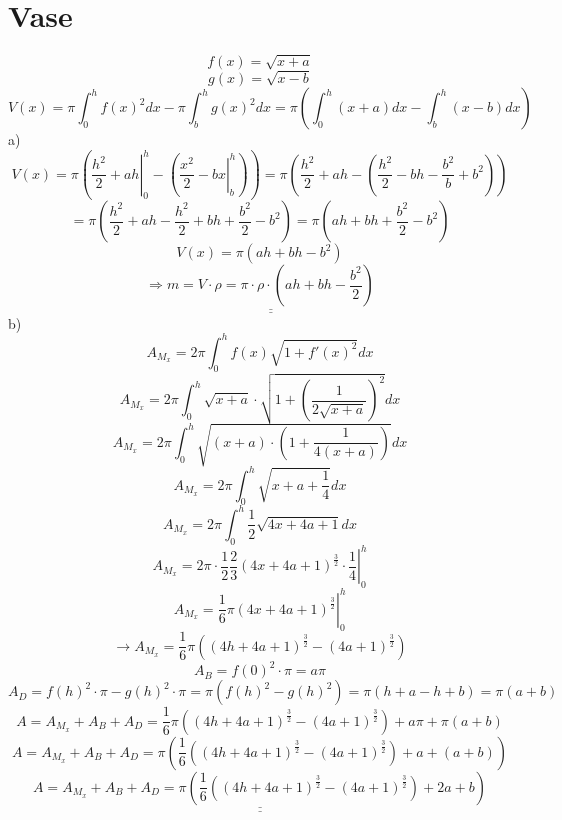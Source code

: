 \section{Vase}
\[ f(x) = \sqrt{x+a} \]
\[ g(x) = \sqrt{x-b} \]
\[ V(x) = \pi \int_0^h f(x)^2 dx - \pi \int_b^h g(x)^2dx = \pi \left( \int_0^h (x+a) dx - \int_b^h (x-b) dx\right) \]
a)
\[ V(x) = \pi\left(\left. \frac{h^2}{2} + ah \right|_0^h - \left(\left. \frac{x^2}{2} - bx \right|_b^h \right) \right) = \pi \left(  \frac{h^2}{2} + ah - \left( \frac{h^2}{2} - bh - \frac{b^2}{b} + b^2 \right)\right) \]
\[ = \pi \left(\frac{h^2}{2} + ah - \frac{h^2}{2} + bh + \frac{b^2}{2} - b^2\right) = \pi \left(ah + bh + \frac{b^2}{2} - b^2\right) \]
\[ V(x) = \pi \left(ah + bh - b^2\right) \]
\[ \Rightarrow \underline{\underline{m = V \cdot \rho = \pi \cdot \rho \cdot \left(ah + bh - \frac{b^2}{2}\right)}} \]
b)
\[ A_{M_x} = 2 \pi \int_0^h f(x) \sqrt{1 + f'(x)^2} dx \]
\[ A_{M_x} = 2 \pi \int_0^h \sqrt{x + a} \cdot \sqrt{1 + \left( \frac{1}{2 \sqrt{x + a}} \right)^2} dx \]
\[ A_{M_x} = 2 \pi \int_0^h \sqrt{(x + a) \cdot \left(1 + \frac{1}{4 (x + a)} \right)} dx \]
\[ A_{M_x} = 2 \pi \int_0^h \sqrt{x + a + \frac{1}{4}} dx \]
\[ A_{M_x} = 2 \pi \int_0^h \frac{1}{2} \sqrt{4x + 4a + 1} dx \]
\[ A_{M_x} = \left. 2 \pi \cdot \frac{1}{2} \frac{2}{3}\left( 4x + 4a + 1 \right)^{\frac{3}{2}} \cdot \frac{1}{4} \right|_0^h \]
\[ A_{M_x} = \left. \frac{1}{6} \pi \left(4x + 4a + 1\right)^{\frac{3}{2}} \right|_0^h \]
\[ \rightarrow A_{M_x} = \frac{1}{6} \pi \left(\left( 4h + 4a + 1 \right)^{\frac{3}{2}} - \left(4a + 1\right)^{\frac{3}{2}}\right) \]
\[ A_B = f(0)^2 \cdot \pi = a \pi \]
\[ A_D = f(h)^2 \cdot \pi - g(h)^2 \cdot \pi = \pi \left( f(h)^2 - g(h)^2 \right) = \pi \left( h + a - h + b \right) = \pi \left( a + b \right) \]
\[ A =  A_{M_x} + A_B + A_D = \frac{1}{6} \pi \left(\left( 4h + 4a + 1 \right)^{\frac{3}{2}} - \left(4a + 1\right)^{\frac{3}{2}}\right) + a \pi + \pi \left( a + b \right) \]
\[ A =  A_{M_x} + A_B + A_D = \pi \left(\frac{1}{6} \left(\left( 4h + 4a + 1 \right)^{\frac{3}{2}} - \left(4a + 1\right)^{\frac{3}{2}}\right) + a + \left( a + b \right)\right) \]
\[ \underline{\underline{A =  A_{M_x} + A_B + A_D = \pi \left(\frac{1}{6} \left(\left( 4h + 4a + 1 \right)^{\frac{3}{2}} - \left(4a + 1\right)^{\frac{3}{2}}\right) + 2a + b\right)}} \]

